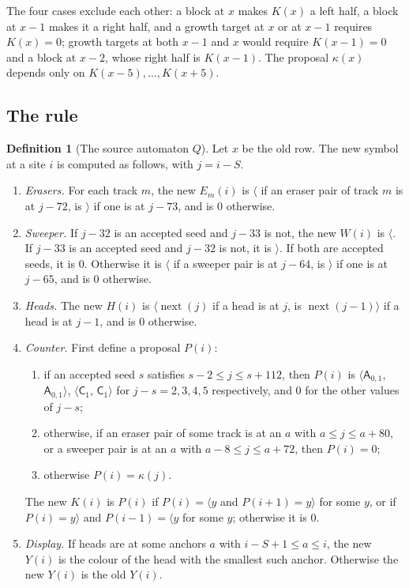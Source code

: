 \documentclass[11pt]{article}
\theoremstyle{plain}
\theoremstyle{definition}
\newtheorem{definition}[theorem]{Definition}
\theoremstyle{remark}
\newcommand{\Lh}[1]{\langle #1}
\newcommand{\Rh}[1]{#1\rangle}
\newcommand{\mA}{\mathsf A}
\newcommand{\mC}{\mathsf C}
\newcommand{\nxt}{\operatorname{next}}
\begin{document}
The four cases exclude each other: a block at $x$ makes $K(x)$ a left half, a block at $x-1$ makes it a right half, and a growth target at $x$ or at $x-1$ requires $K(x)=0$; growth targets at both $x-1$ and $x$ would require $K(x-1)=0$ and a block at $x-2$, whose right half is $K(x-1)$. The proposal $\kappa(x)$ depends only on $K(x-5),\dots,K(x+5)$.

\subsection{The rule}

\begin{definition}[The source automaton $Q$]\label{def:Q}
Let $x$ be the old row. The new symbol at a site $i$ is computed as follows, with $j=i-S$.
\begin{enumerate}[label=(\arabic*)]
\item \emph{Erasers.} For each track $m$, the new $E_m(i)$ is $\langle$ if an eraser pair of track $m$ is at $j-72$, is $\rangle$ if one is at $j-73$, and is $0$ otherwise.
\item \emph{Sweeper.} If $j-32$ is an accepted seed and $j-33$ is not, the new $W(i)$ is $\langle$. If $j-33$ is an accepted seed and $j-32$ is not, it is $\rangle$. If both are accepted seeds, it is $0$. Otherwise it is $\langle$ if a sweeper pair is at $j-64$, is $\rangle$ if one is at $j-65$, and is $0$ otherwise.
\item \emph{Heads.} The new $H(i)$ is $\Lh{\nxt(j)}$ if a head is at $j$, is $\Rh{\nxt(j-1)}$ if a head is at $j-1$, and is $0$ otherwise.
\item \emph{Counter.} First define a proposal $P(i)$:
\begin{enumerate}[label=(\roman*)]
\item if an accepted seed $s$ satisfies $s-2\le j\le s+112$, then $P(i)$ is $\Lh{\mA_{0,1}}$, $\Rh{\mA_{0,1}}$, $\Lh{\mC_1}$, $\Rh{\mC_1}$ for $j-s=2,3,4,5$ respectively, and $0$ for the other values of $j-s$;
\item otherwise, if an eraser pair of some track is at an $a$ with $a\le j\le a+80$, or a sweeper pair is at an $a$ with $a-8\le j\le a+72$, then $P(i)=0$;
\item otherwise $P(i)=\kappa(j)$.
\end{enumerate}
The new $K(i)$ is $P(i)$ if $P(i)=\Lh y$ and $P(i+1)=\Rh y$ for some $y$, or if $P(i)=\Rh y$ and $P(i-1)=\Lh y$ for some $y$; otherwise it is $0$.
\item \emph{Display.} If heads are at some anchors $a$ with $i-S+1\le a\le i$, the new $Y(i)$ is the colour of the head with the smallest such anchor. Otherwise the new $Y(i)$ is the old $Y(i)$.
\end{enumerate}
\end{definition}
\end{document}
